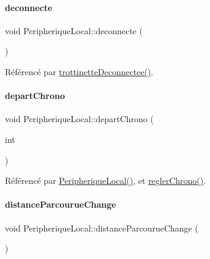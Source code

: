 \mbox{\label{class_peripherique_local_a2a8f0b072821f6d76db20b6f73b6acd0}} 
\paragraph{\texorpdfstring{deconnecte}{deconnecte}}
{\footnotesize\ttfamily void Peripherique\+Local\+::deconnecte (\begin{DoxyParamCaption}{ }\end{DoxyParamCaption})\hspace{0.3cm}{\ttfamily [signal]}}



Référencé par \hyperlink{class_peripherique_local_ab081485bf0f9403d9e7fc5f0407cdc5c}{trottinette\+Deconnectee()}.

\mbox{\label{class_peripherique_local_a8c29d255e41df4bc381f4ff2d1451416}} 
\paragraph{\texorpdfstring{depart\+Chrono}{departChrono}}
{\footnotesize\ttfamily void Peripherique\+Local\+::depart\+Chrono (\begin{DoxyParamCaption}\item[{int}]{ }\end{DoxyParamCaption})\hspace{0.3cm}{\ttfamily [signal]}}



Référencé par \hyperlink{class_peripherique_local_a99a652b8659a3692f164cf1a0382e4bf}{Peripherique\+Local()}, et \hyperlink{class_peripherique_local_ae4f8521445a9dc3a51ff116e1f6597d7}{regler\+Chrono()}.

\mbox{\label{class_peripherique_local_ad5a28dbbf46c2cea6ed4d2c3633578e9}} 
\paragraph{\texorpdfstring{distance\+Parcourue\+Change}{distanceParcourueChange}}
{\footnotesize\ttfamily void Peripherique\+Local\+::distance\+Parcourue\+Change (\begin{DoxyParamCaption}{ }\end{DoxyParamCaption})\hspace{0.3cm}{\ttfamily [signal]}}

